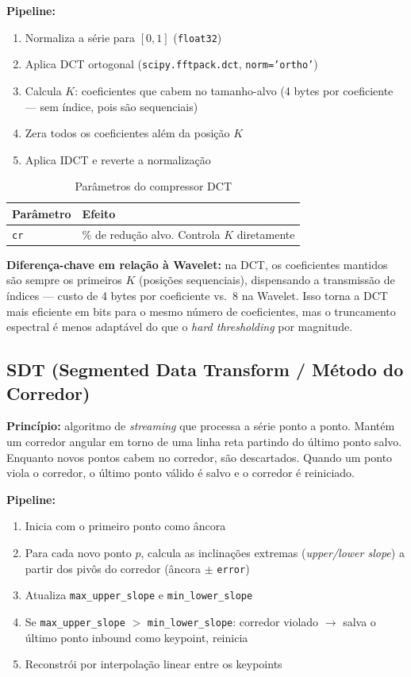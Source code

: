 \documentclass[12pt, a4paper]{article}
\begin{document}
\textbf{Pipeline:}
\begin{enumerate}
    \item Normaliza a série para $[0, 1]$ (\texttt{float32})
    \item Aplica DCT ortogonal (\texttt{scipy.fftpack.dct}, \texttt{norm='ortho'})
    \item Calcula $K$: coeficientes que cabem no tamanho-alvo (4 bytes por coeficiente — sem índice, pois são sequenciais)
    \item Zera todos os coeficientes além da posição $K$
    \item Aplica IDCT e reverte a normalização
\end{enumerate}

\begin{table}[H]
\centering
\caption{Parâmetros do compressor DCT}
\begin{tabular}{lp{9cm}}
\toprule
\textbf{Parâmetro} & \textbf{Efeito} \\
\midrule
\texttt{cr} & \% de redução alvo. Controla $K$ diretamente \\
\bottomrule
\end{tabular}
\end{table}

\textbf{Diferença-chave em relação à Wavelet:} na DCT, os coeficientes mantidos são sempre os primeiros $K$ (posições sequenciais), dispensando a transmissão de índices — custo de 4 bytes por coeficiente vs.\ 8 na Wavelet. Isso torna a DCT mais eficiente em bits para o mesmo número de coeficientes, mas o truncamento espectral é menos adaptável do que o \textit{hard thresholding} por magnitude.

\subsection{SDT (Segmented Data Transform / Método do Corredor)}

\textbf{Princípio:} algoritmo de \textit{streaming} que processa a série ponto a ponto. Mantém um corredor angular em torno de uma linha reta partindo do último ponto salvo. Enquanto novos pontos cabem no corredor, são descartados. Quando um ponto viola o corredor, o último ponto válido é salvo e o corredor é reiniciado.

\textbf{Pipeline:}
\begin{enumerate}
    \item Inicia com o primeiro ponto como âncora
    \item Para cada novo ponto $p$, calcula as inclinações extremas (\textit{upper/lower slope}) a partir dos pivôs do corredor (âncora $\pm$ \texttt{error})
    \item Atualiza \texttt{max\_upper\_slope} e \texttt{min\_lower\_slope}
    \item Se \texttt{max\_upper\_slope} $>$ \texttt{min\_lower\_slope}: corredor violado $\to$ salva o último ponto inbound como keypoint, reinicia
    \item Reconstrói por interpolação linear entre os keypoints
\end{enumerate}
\end{document}
